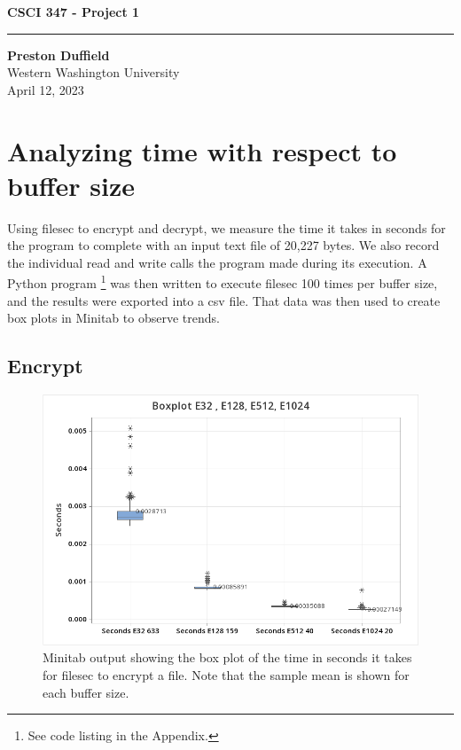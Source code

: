\documentclass{article}
\begin{document}
\noindent
\begin{minipage}[t]{0.6\textwidth}
    \begin{flushleft}
        \LARGE\textbf{CSCI 347 - Project 1} \\
        \vspace{6pt} %
        \hrule width 10cm
        \vspace{12pt}
        \large\textbf{Preston Duffield} \\
        \large Western Washington University \\
        April 12, 2023
        \vspace{24pt}
    \end{flushleft}
\end{minipage}

\section*{Analyzing time with respect to buffer size}

Using filesec to encrypt and decrypt,
we measure the time it takes in seconds for the program to complete with an input text file of 20,227 bytes.
We also record the individual read and write calls the program made during its execution.
A Python program \footnote{See code listing in the Appendix.}
was then written to execute filesec 100 times per buffer size, and the results were exported into a csv file.
That data was then used to create box plots in Minitab to observe trends.



\subsection*{Encrypt}
\begin{figure}[h]
  \centering
  \includegraphics[width=1\textwidth]{./e.png}
  \caption{Minitab output showing the box plot of the time
  in seconds it takes for filesec to encrypt a file.
  Note that the sample mean is shown for each buffer size.}
  \label{fig:equal}
\end{figure}
\end{document}
